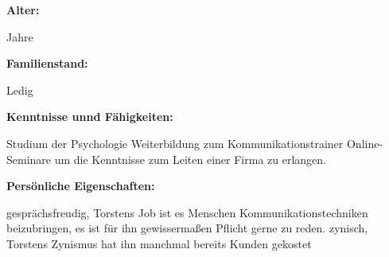 \endgroup
\textbf{Alter:}
\par
\begingroup
\leftskip=30pt
 Jahre
\par
\endgroup
\textbf{Familienstand:}
\par
\begingroup
\leftskip=30pt
\noindent
Ledig
\par
\endgroup
\textbf{Kenntnisse unnd Fähigkeiten:}
\par
\begingroup
\leftskip=30pt
\noindent
Studium der Psychologie \newline
Weiterbildung zum Kommunikationstrainer \newline
Online-Seminare um die Kenntnisse zum Leiten einer Firma zu erlangen.
\par
\endgroup
\textbf{Persönliche Eigenschaften:}
\par
\begingroup
\leftskip=30pt
\noindent
gesprächsfreudig, Torstens Job ist es Menschen Kommunikationstechniken beizubringen, es ist für ihn gewissermaßen Pflicht gerne zu reden. \newline
zynisch, Torstens Zynismus hat ihn manchmal bereits Kunden gekostet
\par
\endgroup
